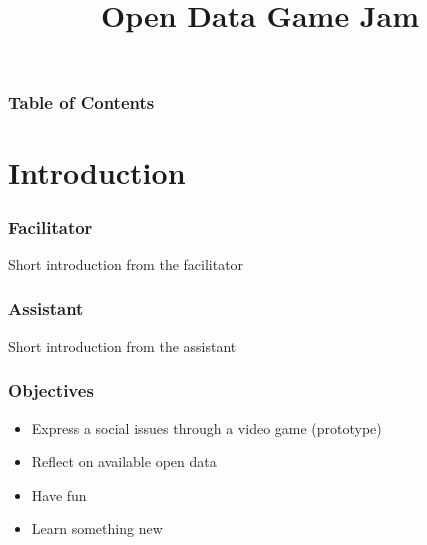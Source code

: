 \documentclass{beamer}
\title[Open Data Game Jam] %
{Open Data Game Jam}
\begin{document}
\frame{\titlepage}


\begin{frame}
\frametitle{Table of Contents}
\tableofcontents
\end{frame}


\section{Introduction}

\begin{frame}
\frametitle{Facilitator}
Short introduction from the facilitator
\end{frame}



\begin{frame}
\frametitle{Assistant}
Short introduction from the assistant
\end{frame}

\begin{frame}
\frametitle{Objectives}
\begin{itemize}
    \item Express a social issues through a video game (prototype)
    \item Reflect on available open data
    \item Have fun
    \item Learn something new
\end{itemize}
\end{frame}
\end{document}
